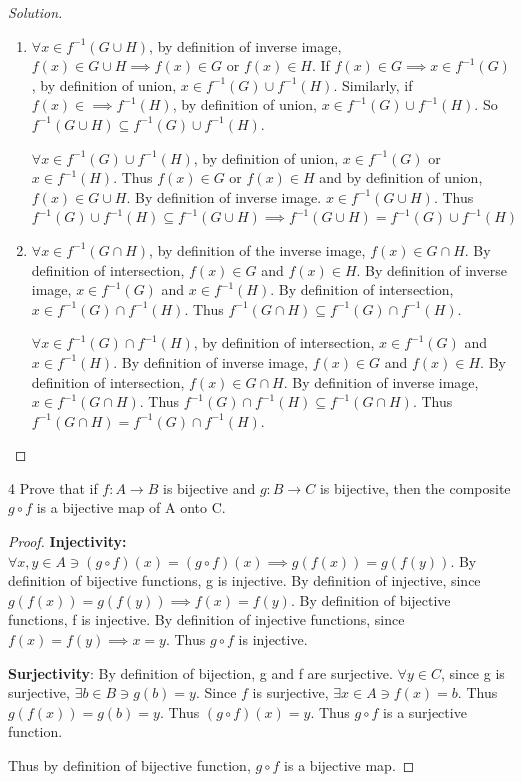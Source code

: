 \documentclass{article}
\newenvironment{solution}
{\renewcommand\qedsymbol{$\blacksquare$}\begin{proof}[Solution]}
{\end{proof}}
\begin{document}
\begin{solution}
    \begin{enumerate}
        \item $\forall x \in f^{-1}(G \cup H)$, by definition of inverse image, $f(x) \in G \cup H \implies f(x) \in G$ or $f(x) \in H$. If $f(x) \in G \implies x \in f^{-1}(G)$, by definition of union, $x \in f^{-1}(G) \cup f^{-1}(H)$. Similarly, if $f(x) \in \implies f^{-1}(H)$, by definition of union, $x \in f^{-1}(G) \cup f^{-1}(H)$. So $f^{-1}(G \cup H) \subseteq f^{-1}(G) \cup f^{-1}(H)$. 
        
        $\forall x \in f^{-1}(G) \cup f^{-1}(H)$, by definition of union, $x \in f^{-1}(G)$ or $x \in f^{-1}(H)$. Thus $f(x) \in G$ or $f(x) \in H$ and by definition of union, $f(x) \in G \cup H$. By definition of inverse image. $x \in f^{-1}(G \cup H)$. Thus $f^{-1}(G) \cup f^{-1}(H) \subseteq f^{-1}(G \cup H) \implies f^{-1}(G \cup H) = f^{-1}(G) \cup f^{-1}(H)$
        
        \item $\forall x \in f^{-1}(G \cap H)$, by definition of the inverse image, $f(x) \in G \cap H$. By definition of intersection, $f(x) \in G$ and $f(x) \in H$. By definition of inverse image, $x \in f^{-1}(G)$ and $x \in f^{-1}(H)$. By definition of intersection, $x \in f^{-1}(G) \cap f^{-1}(H)$. Thus $f^{-1}(G \cap H) \subseteq f^{-1}(G) \cap f^{-1}(H)$.
        
        $\forall x \in f^{-1}(G) \cap f^{-1}(H)$, by definition of intersection, $x \in f^{-1}(G)$ and $x \in f^{-1}(H)$. By definition of inverse image, $f(x) \in G$ and $f(x) \in H$. By definition of intersection, $f(x) \in G \cap H$. By definition of inverse image, $x \in f^{-1}(G \cap H)$. Thus $f^{-1}(G) \cap f^{-1}(H) \subseteq f^{-1}(G \cap H)$. Thus $f^{-1}(G \cap H)=f^{-1}(G) \cap f^{-1}(H)$.          
    \end{enumerate}
\end{solution}

\bigskip

\begin{PROB}{4}\label{Problem 4.}
    Prove that if $f : A \to B$ is bijective and $g : B \to C$ is bijective, then the composite $g \circ f$ is a bijective map of A onto C.
\end{PROB}
\begin{proof}

    \textbf{Injectivity:} $\forall x, y \in A \ni (g \circ f)(x) = (g \circ f)(x) \implies g(f(x)) = g(f(y))$. By definition of bijective functions, g is injective. By definition of injective, since $g(f(x)) = g(f(y)) \implies f(x) = f(y)$. By definition of bijective functions, f is injective. By definition of injective functions, since $f(x) = f(y) \implies x = y$. Thus $g \circ f$ is injective.
    
    \textbf{Surjectivity}: By definition of bijection, g and f are surjective. $\forall y \in C$, since g is surjective, $\exists b \in B \ni g(b) = y$. Since $f$ is surjective, $\exists x \in A \ni f(x) = b$. Thus $g(f(x)) = g(b) = y$. Thus $(g \circ f)(x) = y$. Thus $g \circ f  $ is a surjective function. 
    
    Thus by definition of bijective function, $g \circ f$ is a bijective map. 
\end{proof}
\end{document}
